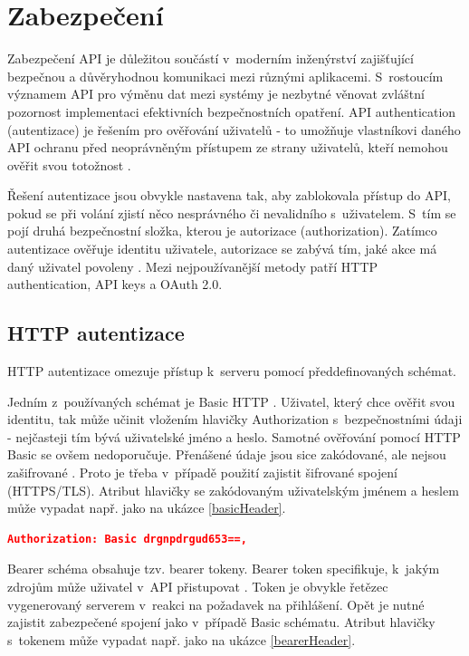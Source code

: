 \documentclass[czech, bc, kiv, he, iso690numb, viewonly]{fasthesis} %
\begin{document}
%
%
\section{Zabezpečení}
Zabezpečení API je důležitou součástí v~moderním inženýrství zajišťující bezpečnou a důvěryhodnou komunikaci mezi různými aplikacemi. S~rostoucím významem API pro výměnu dat mezi
systémy je nezbytné věnovat zvláštní pozornost implementaci efektivních bezpečnostních opatření. API authentication (autentizace) je řešením pro ověřování uživatelů - to umožňuje
vlastníkovi daného API ochranu před neoprávněným přístupem ze strany uživatelů, kteří nemohou ověřit svou totožnost \cite{whatIsAPI}.

Řešení autentizace jsou obvykle nastavena tak, aby zablokovala přístup do API, pokud se při volání zjistí něco nesprávného či nevalidního s~uživatelem. S~tím se pojí druhá bezpečnostní
složka, kterou je autorizace (authorization). Zatímco autentizace ověřuje identitu uživatele, autorizace se zabývá tím, jaké akce má daný uživatel povoleny \cite{mostUsedAuthentication}. 
Mezi nejpoužívanější metody patří HTTP authentication, API keys a OAuth 2.0. 

\subsection{HTTP autentizace}
HTTP autentizace omezuje přístup k~serveru pomocí předdefinovaných schémat. 

Jedním z~používaných schémat je Basic HTTP \cite{mozillaHTTPAuth}. Uživatel, který chce ověřit svou identitu, tak může učinit vložením hlavičky 
Authorization s~bezpečnostními údaji - nejčasteji tím bývá uživatelské jméno a heslo. 
Samotné ověřování pomocí HTTP Basic se ovšem nedoporučuje. Přenášené údaje jsou sice zakódované, ale nejsou zašifrované \cite{mozillaHTTPAuth}. Proto je třeba v~případě použití zajistit šifrované spojení (HTTPS/TLS). Atribut hlavičky se zakódovaným uživatelským jménem a heslem může vypadat např. jako na ukázce \ref{basicHeader}.

\begin{lstlisting}[language=json, caption={Autorizační atribut - Basic schéma}, label=basicHeader]
	Authorization: Basic drgnpdrgud653==,
\end{lstlisting}

Bearer schéma obsahuje tzv. bearer tokeny. Bearer token specifikuje, k~jakým zdrojům může uživatel v~API přistupovat \cite{mostUsedAuthentication}. Token je obvykle řetězec vygenerovaný serverem v~reakci na požadavek na přihlášení. Opět je nutné zajistit zabezpečené spojení jako v~případě Basic schématu. Atribut hlavičky s~tokenem může vypadat např. jako na ukázce \ref{bearerHeader}.
\end{document}
